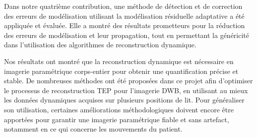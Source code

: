 Dans notre quatrième contribution, une méthode de détection et de correction des erreurs de modélisation utilisant la modélisation résiduelle adaptative a été appliquée et évaluée. Elle a montré des résultats prometteurs pour la réduction des erreurs de modélisation et leur propagation, tout en permettant la généricité dans l'utilisation des algorithmes de reconstruction dynamique.

Nos résultats ont montré que la reconstruction dynamique est nécessaire en imagerie paramétrique corps-entier pour obtenir une quantification précise et stable. De nombreuses méthodes ont été proposées dans ce projet afin d’optimiser le processus de reconstruction TEP pour l'imagerie DWB, en utilisant au mieux les données dynamiques acquises sur plusieurs positions de lit. Pour généraliser son utilisation, certaines améliorations méthodologiques doivent encore être apportées pour garantir une imagerie paramétrique fiable et sans artefact, notamment en ce qui concerne les mouvements du patient.


